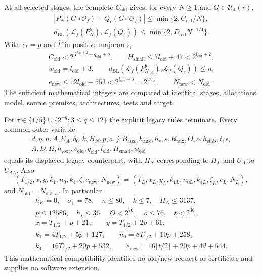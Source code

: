 \begin{theorem}
\label{uda:clause-e}
At all selected stages, the complete $C_{\mathrm{old}}$ gives, for every
$N\ge1$ and $G\in\mathcal U_4(r)$,
\begin{gather*}
 |P_N^b(G\circ\mathcal O_f)-Q_\epsilon(G\circ\mathcal O_f)|
 \le\min\{2,C_{\mathrm{old}}/N\},\\
 d_{\mathrm{BL}}(\mathcal L_f(P_N^b),\mathcal L_f(Q_\epsilon))
 \le\min\{2,D_{\mathrm{old}}N^{-1/4}\}.
\end{gather*}
With $c_*=p$ and $\overline F$ in positive majorants,
\begin{gather*}
 C_{\mathrm{old}}<2^{\,2^{l_{\mathrm{old}}+2}+q_{\mathrm{old}}+o},\qquad
 H_{\mathrm{small}}\le7l_{\mathrm{old}}+47<2^{l_{\mathrm{old}}+2},\\
 w_{\mathrm{old}}=l_{\mathrm{old}}+3,\qquad
 d_{\mathrm{BL}}(\mathcal L_f(P_{N_{\mathrm{old}}}^b),
                  \mathcal L_f(Q_\epsilon))\le\eta,\\
 e_{\mathrm{new}}\le12l_{\mathrm{old}}+553<2^{l_{\mathrm{old}}+3}
 =2^{w_{\mathrm{old}}},\qquad N_{\mathrm{new}}<N_{\mathrm{old}}.
\end{gather*}
The sufficient mathematical integers are compared at identical stages,
allocations, model, source premises, architectures, tests and target.
\end{theorem}

\begin{theorem}
\label{uda:clause-f}
For $\tau\in\{1/5\}\cup\{2^{-q}:3\le q\le12\}$ the explicit legacy
rules terminate. Every common outer variable
\[
\begin{gathered}
 d,\eta,n,A,U_A,b_0,k,H_N,p,a,j,B_{\mathrm{aux}},h_{\mathrm{aux}},h_s,s,
 R_{\mathrm{aux}},O,o,h_{\mathrm{stab}},t,\epsilon,\\
 \Lambda,D,\Omega,h_{\mathrm{root}},v_{\mathrm{old}},q_{\mathrm{old}},
 l_{\mathrm{old}},H_{\mathrm{small}},w_{\mathrm{old}}
\end{gathered}
\]
equals its displayed legacy counterpart, with $H_N$ corresponding to $H_L$
and $U_A$ to $U_{AL}$. Also
\[
 (T_{1/2},x,y,k_1,n_0,k_4,\zeta,e_{\mathrm{new}},N_{\mathrm{new}})
 =(T_L,x_L,y_L,k_{1L},n_{0L},k_{4L},\zeta_L,e_L,N_L),
\]
and $N_{\mathrm{old}}=N_{\mathrm{old},L}$. In particular
\begin{gather*}
 h_K=0,\quad o_+=78,\quad n\le80,\quad k\le7,\quad H_N\le3137,\\
 p\le12586,\quad h_s\le36,\quad O<2^{76},\quad o\le76,\quad t<2^{36},\\
 x=T_{1/2}+p+21,\qquad y=T_{1/2}+2p+61,\\
 k_1=4T_{1/2}+5p+127,\qquad n_0=8T_{1/2}+10p+258,\\
 k_4=16T_{1/2}+20p+532,\qquad
 e_{\mathrm{new}}=16\lceil t/2\rceil+20p+4d+544.
\end{gather*}
This mathematical compatibility identifies no old/new request or certificate
and supplies no software extension.
\end{theorem}

